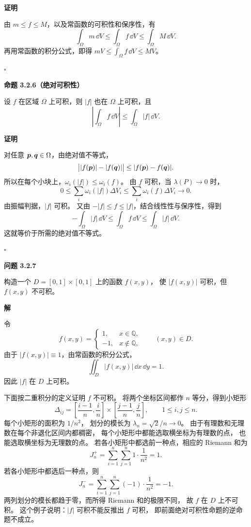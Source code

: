 \textbf{证明}

由 $m\le f\le M$，以及常函数的可积性和保序性，有
\[
\int_\Omega m\,\dd V
\le\int_\Omega f\,\dd V
\le\int_\Omega M\,\dd V.
\]
再用常函数的积分公式，即得
$mV\le\displaystyle\int_\Omega f\,\dd V\le MV$。


$\square$





\textbf{命题 3.2.6（绝对可积性）}


设 $f$ 在区域 $\Omega$ 上可积，则 $|f|$ 也在 $\Omega$ 上可积，且
\[
\left|\int_\Omega f\,\dd V\right|
\le\int_\Omega|f|\,\dd V.
\]





\textbf{证明}

对任意 $\boldsymbol{p},\boldsymbol{q}\in\Omega$，由绝对值不等式，
\[
\bigl||f(\boldsymbol{p})|-|f(\boldsymbol{q})|\bigr|
\le|f(\boldsymbol{p})-f(\boldsymbol{q})|.
\]
所以在每个小块上，$\omega_i(|f|)\le\omega_i(f)$。
由 $f$ 可积，当 $\lambda(P)\to0$ 时，
\[
0\le\sum_i\omega_i(|f|)\Delta V_i
\le\sum_i\omega_i(f)\Delta V_i\longrightarrow0.
\]
由振幅判据，$|f|$ 可积。
又由 $-|f|\le f\le|f|$，结合线性性与保序性，得到
\[
-\int_\Omega|f|\,\dd V
\le\int_\Omega f\,\dd V
\le\int_\Omega|f|\,\dd V.
\]
这就等价于所需的绝对值不等式。


$\square$





\textbf{问题 3.2.7}

构造一个 $D=[0,1]\times[0,1]$ 上的函数 $f(x,y)$，
使 $|f(x,y)|$ 可积，但 $f(x,y)$ 不可积。





\textbf{解}

令
\[
f(x,y)=
\begin{cases}
1,&x\in\mathbb Q,\\
-1,&x\notin\mathbb Q,
\end{cases}
\qquad (x,y)\in D.
\]
由于 $|f(x,y)|\equiv1$，由常函数的积分公式，
\[
\iint_D|f(x,y)|\,\dd x\,\dd y=1.
\]
因此 $|f|$ 在 $D$ 上可积。

下面按二重积分的定义证明 $f$ 不可积。
将两个坐标区间都作 $n$ 等分，得到小矩形
\[
\Delta_{ij}=
\left[\frac{i-1}{n},\frac{i}{n}\right]
\times\left[\frac{j-1}{n},\frac{j}{n}\right],
\qquad 1\le i,j\le n.
\]
每个小矩形的面积为 $1/n^2$，
划分的模长为 $\lambda_n=\sqrt2/n\to0$。
由于有理数和无理数在每个非退化区间内都稠密，
每个小矩形中都能选取横坐标为有理数的点，
也能选取横坐标为无理数的点。
若各小矩形中都选前一种点，相应的 Riemann 和为
\[
J_n^+=\sum_{i=1}^n\sum_{j=1}^n1\cdot\frac1{n^2}=1.
\]
若各小矩形中都选后一种点，则
\[
J_n^-=\sum_{i=1}^n\sum_{j=1}^n(-1)\cdot\frac1{n^2}=-1.
\]
两列划分的模长都趋于零，而所得 Riemann 和的极限不同，
故 $f$ 在 $D$ 上不可积。
这个例子说明：$|f|$ 可积不能反推出 $f$ 可积，
即前面绝对可积性命题的逆命题不成立。






